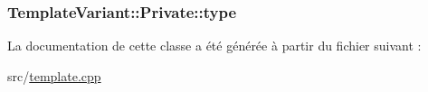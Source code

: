 \subsubsection[{type}]{ Template\+Variant\+::\+Private\+::type}\label{class_template_variant_1_1_private_af5bb43ca3f5ccc96dd16274b21c2120c}


La documentation de cette classe a été générée à partir du fichier suivant \+:\begin{DoxyCompactItemize}
\item 
src/\hyperlink{template_8cpp}{template.\+cpp}\end{DoxyCompactItemize}
